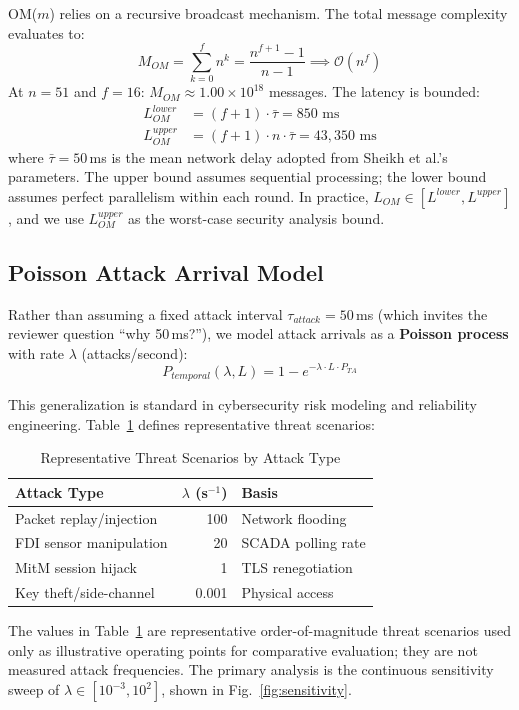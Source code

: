 \documentclass[10pt,twocolumn,letterpaper]{article}
\begin{document}
OM($m$) relies on a recursive broadcast mechanism. The total message complexity evaluates to:
\begin{equation}
M_{OM} = \sum_{k=0}^{f} n^k = \frac{n^{f+1}-1}{n-1} \implies \mathcal{O}(n^f)
\end{equation}
At $n = 51$ and $f = 16$: $M_{OM} \approx 1.00 \times 10^{18}$ messages. The latency is bounded:
\begin{align}
L_{OM}^{lower} &= (f+1) \cdot \bar{\tau} = 850\text{ ms} \\
L_{OM}^{upper} &= (f+1) \cdot n \cdot \bar{\tau} = 43{,}350\text{ ms}
\end{align}
where $\bar{\tau} = 50$\,ms is the mean network delay adopted from Sheikh et al.'s parameters. The upper bound assumes sequential processing; the lower bound assumes perfect parallelism within each round. In practice, $L_{OM} \in [L^{lower}, L^{upper}]$, and we use $L_{OM}^{upper}$ as the worst-case security analysis bound.

\subsection{Poisson Attack Arrival Model}
\label{sec:poisson}

Rather than assuming a fixed attack interval $\tau_{attack} = 50$\,ms (which invites the reviewer question ``why 50\,ms?''), we model attack arrivals as a \textbf{Poisson process} with rate $\lambda$ (attacks/second):
\begin{equation}
\boxed{P_{temporal}(\lambda, L) = 1 - e^{-\lambda \cdot L \cdot P_{TA}}}
\label{eq:poisson}
\end{equation}

This generalization is standard in cybersecurity risk modeling and reliability engineering. Table~\ref{tab:attack_rates} defines representative threat scenarios:

\begin{table}[htbp]
\caption{Representative Threat Scenarios by Attack Type}
\label{tab:attack_rates}
\centering
\scriptsize
\begin{tabular}{@{}lrl@{}}
\toprule
\textbf{Attack Type} & \textbf{$\lambda$ (s$^{-1}$)} & \textbf{Basis} \\
\midrule
Packet replay/injection & 100 & Network flooding \\
FDI sensor manipulation & 20  & SCADA polling rate \\
MitM session hijack     & 1   & TLS renegotiation \\
Key theft/side-channel  & 0.001 & Physical access \\
\bottomrule
\end{tabular}
\end{table}
The values in Table~\ref{tab:attack_rates} are representative order-of-magnitude threat scenarios used only as illustrative operating points for comparative evaluation; they are not measured attack frequencies. The primary analysis is the continuous sensitivity sweep of $\lambda \in [10^{-3}, 10^2]$, shown in Fig.~\ref{fig:sensitivity}.
\end{document}
